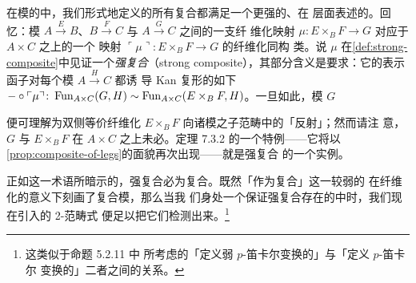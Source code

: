 在模的\trVirtualEquipment{}中，我们形式地定义的所有复合都满足一个更强的、在%
\trInfinityCosmos{}层面表述的\trUniversalProperty。回忆：模
$A\xrightarrow{E}B$、$B\xrightarrow{F}C$ 与 $A\xrightarrow{G}C$ 之间的一支纤
维化映射 $\mu\colon E\times_{B}F\xrightarrow{}G$ 对应于 $A\times C$ 之上的一个%
\trSpan{}映射 $\ulcorner\mu\urcorner\colon E\times_{B}F\to G$ 的纤维化同构
类。说 $\mu$ 在\cref{def:strong-composite}中见证一个\emph{强复合}（strong
composite），其部分含义是要求：它的表示函子对每个模 $A\xrightarrow{H}C$ 都诱
导 Kan 复形的如下\trEquivalence
$-\circ\ulcorner\mu\urcorner\colon\operatorname{Fun}_{A\times C}(G,H)\sim\operatorname{Fun}_{A\times C}(E\times_{B}F,H)$。一旦如此，模 $G$

便可理解为双侧等价纤维化 $E\times_{B}F$ 向诸模之子范畴中的「反射」；然而请注
意，$G$ 与 $E\times_{B}F$ 在 $A\times C$ 之上未必\trEquivalence。定理 7.3.2
的一个特例——它将以\cref{prop:composite-of-legs}的面貌再次出现——就是强复合
的一个实例。

正如这一术语所暗示的，强复合必为复合。既然「作为复合」这一较弱的%
\trUniversalProperty{}在纤维化\trEquivalence{}的意义下刻画了复合模，那么当我
们身处一个保证强复合存在的\trInfinityCosmos{}中时，我们现在引入的 2-范畴式%
\trUniversalProperty{}便足以把它们检测出来。\footnote{这类似于命题 5.2.11 中
所考虑的「定义弱 $p$-笛卡尔变换的\trUniversalProperty{}」与「定义 $p$-笛卡尔
变换的\trUniversalProperty{}」二者之间的关系。}

